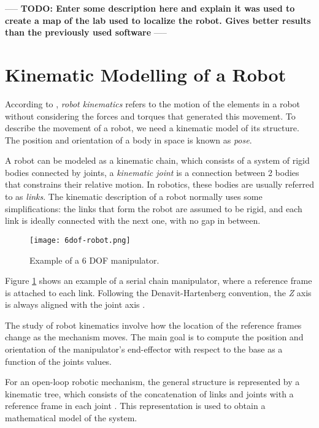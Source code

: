 ----- \textbf{TODO: Enter some description here and explain it was used to create a map of the lab used to localize the robot. Gives better results than the previously used software} -----

\section{Kinematic Modelling of a Robot}

According to \citet{Handbook}, \textit{robot kinematics} refers to the motion of the elements in a robot without considering the forces and torques that generated this movement. 
To describe the movement of a robot, we need a kinematic model of its structure. The position and orientation of a body  in space is known as \textit{pose}.

A robot can be modeled as a kinematic chain, which consists of a system of rigid bodies connected by joints, a \textit{kinematic joint} is a connection between 2 bodies that constrains their relative motion. In robotics, these bodies are usually referred to as \textit{links}.  The kinematic description of a robot normally uses some simplifications: the links that form the robot are assumed to be rigid, and each link is ideally connected with the next one, with no gap in between.
\begin{figure}[H]
	\centering
	\texttt{[image: 6dof-robot.png]}
	\vspace{-10pt}
	\caption[Example of a 6 DOF manipulator]{Example of a 6 DOF manipulator. \citep[chap. 1, page 24]{Handbook}}
	\vspace{-15pt}
	\label{fig:kinematic}
\end{figure}

Figure \ref{fig:kinematic} shows an example of a serial chain manipulator, where a reference frame is attached to each link. Following the Denavit-Hartenberg convention, the \textit{Z} axis is always aligned with the joint axis \citep{Craig}.

The study of robot kinematics involve how the location of the reference frames change as the mechanism moves. The main goal is to compute the position and orientation of the manipulator's end-effector with respect to the base as a function of the joints values.

For an open-loop robotic mechanism, the general structure is represented by a kinematic tree, which consists of the concatenation of links and joints with a reference frame in each joint \citep{Handbook}. This representation is used to obtain a mathematical model of the system. 

